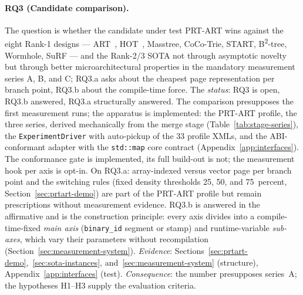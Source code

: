 \begin{nurkurz}
\paragraph{RQ3 (Candidate comparison).} The question is whether the candidate under test PRT-ART wins
against the eight Rank-1 designs --- ART~\cite{leis2013art}, HOT~\cite{binna2018hot}, Masstree, CoCo-Trie,
START, B\textsuperscript{2}-tree, Wormhole, SuRF --- and the Rank-2/3 SOTA not through asymptotic novelty
but through better microarchitectural properties in the mandatory measurement series A, B, and C\@; RQ3.a
asks about the cheapest page representation per branch point, RQ3.b about the compile-time force. The
\emph{status}: RQ3 is open, RQ3.b answered, RQ3.a structurally answered. The comparison presupposes the
first measurement runs; the apparatus is implemented: the PRT-ART profile, the three series, derived
mechanically from the merge stage (Table~\ref{tab:stage-series}), the \texttt{ExperimentDriver} with
auto-pickup of the 33 profile XMLs, and the ABI-conformant adapter with the \texttt{std::map} core contract
(Appendix~\ref{app:interfaces}). The conformance gate is implemented, its full build-out is not; the
measurement hook per axis is opt-in. On RQ3.a: array-indexed versus vector page per branch point and the
switching rules (fixed density thresholds 25, 50, and 75~percent, Section~\ref{sec:prtart-demo}) are part
of the PRT-ART profile but remain prescriptions without measurement evidence. RQ3.b is answered in the
affirmative and is the construction principle: every axis divides into a compile-time-fixed \emph{main
axis} (\texttt{binary\_id} segment or stamp) and runtime-variable \emph{sub-axes}, which vary their
parameters without recompilation (Section~\ref{sec:measurement-system}).
\emph{Evidence}:
Sections~\ref{sec:prtart-demo},~\ref{sec:sota-instances}, and~\ref{sec:measurement-system} (structure),
Appendix~\ref{app:interfaces} (test).
\emph{Consequence}: the number presupposes series~A\@; the
hypotheses H1--H3 supply the evaluation criteria.
\end{nurkurz}

